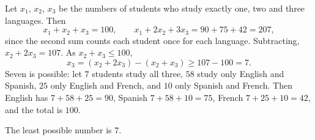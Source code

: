 Let $x_1$, $x_2$, $x_3$ be the numbers of students who study exactly one, two and three languages. Then
\[x_1+x_2+x_3=100,\qquad x_1+2x_2+3x_3=90+75+42=207,\]
since the second sum counts each student once for each language. Subtracting, $x_2+2x_3=107$. As $x_2+x_3\le100$,
\[x_3=\left(x_2+2x_3\right)-\left(x_2+x_3\right)\ge107-100=7.\]
Seven is possible: let $7$ students study all three, $58$ study only English and Spanish, $25$ only English and French, and $10$ only Spanish and French. Then English has $7+58+25=90$, Spanish $7+58+10=75$, French $7+25+10=42$, and the total is $100$.

The least possible number is $\boxed{7}$.
